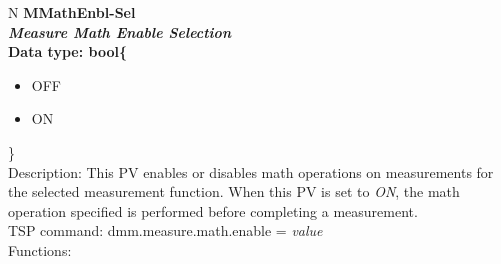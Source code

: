 \documentclass[openany]{article}
\begin{document}
		\begin{tabular}{N}
			\hline
			\bfseries MMathEnbl-Sel\label{pv:mmathenbl-sel} \\ \hline
			\emph{Measure Math Enable Selection} \\
			Data type: bool\{\begin{itemize}[noitemsep]
				\small
				\item[] OFF
				\item[] ON
			\end{itemize}\} \\
			Description: This PV enables or disables math operations on measurements for the selected measurement function. When this PV is set to \emph{ON}, the math operation specified is performed before completing a measurement. \\
			TSP command: dmm.measure.math.enable = \emph{value} \\
			Functions: \\
			\arrayrulecolor{\FuncTableBorderColor}

		\end{tabular}
\end{document}
